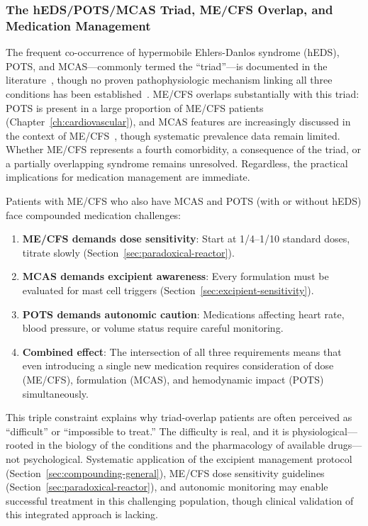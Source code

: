 \subsubsection{The hEDS/POTS/MCAS Triad, ME/CFS Overlap, and Medication Management}
\label{sec:mcas-mecfs-pots-triad}

The frequent co-occurrence of hypermobile Ehlers-Danlos syndrome (hEDS), POTS, and MCAS---commonly termed the ``triad''---is documented in the literature~\cite{Wang2021triad,Kucharik2020}, though no proven pathophysiologic mechanism linking all three conditions has been established~\cite{Kucharik2020}. ME/CFS overlaps substantially with this triad: POTS is present in a large proportion of ME/CFS patients (Chapter~\ref{ch:cardiovascular}), and MCAS features are increasingly discussed in the context of ME/CFS~\cite{Weinstock2024Ketotifen,Afrin2020mcas}, though systematic prevalence data remain limited. Whether ME/CFS represents a fourth comorbidity, a consequence of the triad, or a partially overlapping syndrome remains unresolved. Regardless, the practical implications for medication management are immediate.

\begin{observation}
\label{obs:triad-medication}
Patients with ME/CFS who also have MCAS and POTS (with or without hEDS) face compounded medication challenges:

\begin{enumerate}
    \item \textbf{ME/CFS demands dose sensitivity}: Start at 1/4--1/10 standard doses, titrate slowly (Section~\ref{sec:paradoxical-reactor}).
    \item \textbf{MCAS demands excipient awareness}: Every formulation must be evaluated for mast cell triggers (Section~\ref{sec:excipient-sensitivity}).
    \item \textbf{POTS demands autonomic caution}: Medications affecting heart rate, blood pressure, or volume status require careful monitoring.
    \item \textbf{Combined effect}: The intersection of all three requirements means that even introducing a single new medication requires consideration of dose (ME/CFS), formulation (MCAS), and hemodynamic impact (POTS) simultaneously.
\end{enumerate}

This triple constraint explains why triad-overlap patients are often perceived as ``difficult'' or ``impossible to treat.'' The difficulty is real, and it is physiological---rooted in the biology of the conditions and the pharmacology of available drugs---not psychological. Systematic application of the excipient management protocol (Section~\ref{sec:compounding-general}), ME/CFS dose sensitivity guidelines (Section~\ref{sec:paradoxical-reactor}), and autonomic monitoring may enable successful treatment in this challenging population, though clinical validation of this integrated approach is lacking.
\end{observation}

